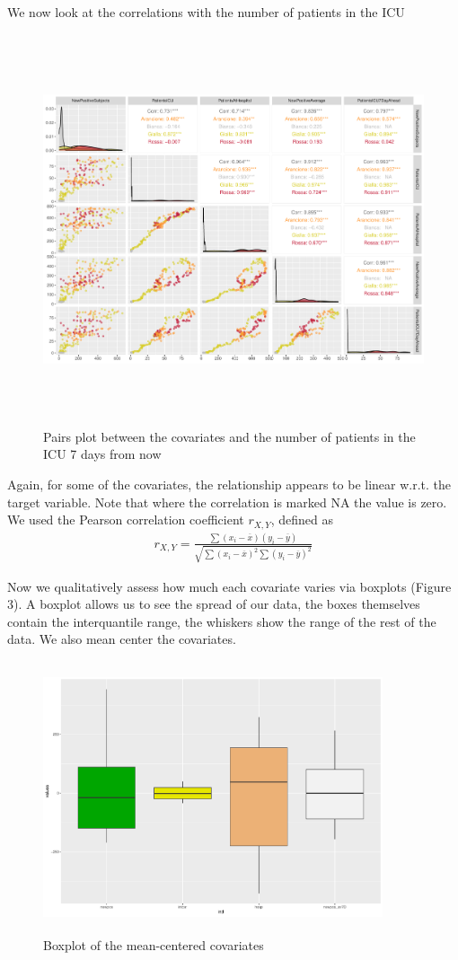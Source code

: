 \documentclass[12pt,a4paper]{article}
\theoremstyle{definition}
\theoremstyle{remark}
\begin{document}
	\newpage
	We now look at the correlations with the number of patients in the ICU
		\begin{figure}[htb!]
		\centering
		\includegraphics[width=150mm, height=115mm,scale=0.5]{corrplot1.pdf}
		\caption{Pairs plot between the covariates and the number of patients in the ICU 7 days from now}
	\end{figure}
	
	
	Again, for some of the covariates, the relationship appears to be linear w.r.t. the target variable. Note that where the correlation is marked NA the value is zero. We used the Pearson correlation coefficient $r_{X,Y}$, defined as
	\begin{align*}
		r_{X,Y} = \frac{\sum(x_i-\overline{x})(y_i-\overline{y})}{\sqrt{\sum(x_i-\overline{x})^2\sum(y_i-\overline{y})^2}}
	\end{align*}


    Now we qualitatively assess how much each covariate varies via boxplots (Figure 3). A boxplot allows us to see the spread of our data, the boxes themselves contain the interquantile range, the whiskers show the range of the rest of the data. We also mean center the covariates.
    	\begin{figure}[htb!]
    	\centering
    	\includegraphics[width=100mm, height=80mm,scale=0.5]{box.pdf}
    	\caption{Boxplot of the mean-centered covariates}
    \end{figure}
    
\end{document}
